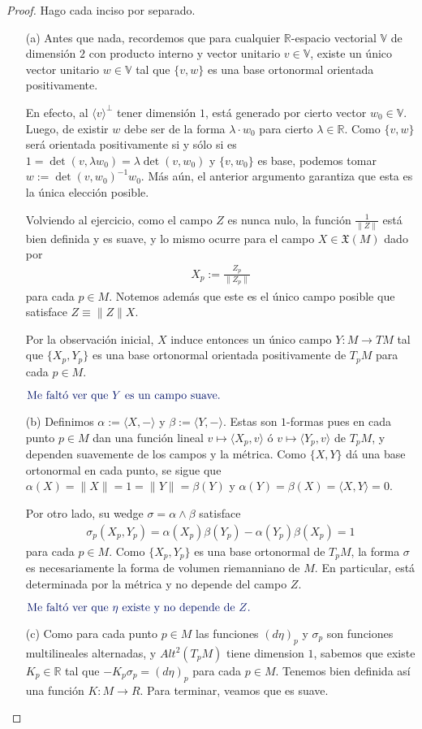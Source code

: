 \documentclass[11pt]{article}
\newcommand{\R}{\mathbb{R}}
\newcommand{\X}{\mathfrak{X}}
\newcommand{\ip}[1]{\langle #1 \rangle}
\newcommand{\paint}[1]{\color{color}{#1}}
\newcommand{\tpaing}[1]{\paint{\text{#1}}}
\begin{document}
\begin{proof} Hago cada inciso por separado.
\begin{itemize}[listparindent = \parindent]
\item[(a)] Antes que nada, recordemos que para cualquier $\R$-espacio vectorial $\mathbb{V}$ de dimensión $2$ con producto interno y vector unitario $v \in \mathbb{V}$, existe un único vector unitario $w \in \mathbb{V}$ tal que $\{v,w\}$ es una base ortonormal orientada positivamente. 

En efecto, al $\ip{v}^\perp$ tener dimensión $1$, está generado por cierto vector $w_0 \in \mathbb{V}$. Luego, de existir $w$ debe ser de la forma $\lambda \cdot w_0$ para cierto $\lambda \in \R$. Como $\{v,w\}$ será orientada positivamente si y sólo si es $1 = \det(v,\lambda w_0)= \lambda \det(v,w_0)$ y $\{v,w_0\}$ es base, podemos tomar $w := \det(v,w_0)^{-1}w_0$. Más aún, el anterior argumento garantiza que esta es la única elección posible.

Volviendo al ejercicio, como el campo $Z$ es nunca nulo, la función $\frac{1}{\|Z\|}$ está bien definida y es suave, y lo mismo ocurre para el campo $X \in \X(M)$ dado por
\begin{align*}
X_p := \frac{Z_p}{\|Z_p\|}
\end{align*}
para cada $p \in M$. Notemos además que este es el único campo posible que satisface $Z \equiv \|Z\|X$. 

Por la observación inicial, $X$ induce entonces un único campo $Y : M \to TM$ tal que $\{X_p,Y_p\}$ es una base ortonormal orientada positivamente de $T_pM$ para cada $p \in M$.
\begin{center}
$\tpaing{Me faltó ver que $Y$ es un campo suave.}$
\end{center}
\item[(b)] Definimos $\alpha := \ip{X,-}$ y $\beta := \ip{Y,-}$. Estas son $1$-formas pues en cada punto $p \in M$ dan una función lineal $v \mapsto \ip{X_p,v}$ ó $v \mapsto \ip{Y_p,v}$ de $T_pM$, y dependen suavemente de los campos y la métrica. Como $\{X,Y\}$ dá una base ortonormal en cada punto, se sigue que $\alpha(X) = \|X\| = 1 = \|Y\| = \beta(Y)$ y $\alpha(Y) = \beta(X) = \ip{X,Y} = 0$. 

Por otro lado, su wedge $\sigma = \alpha \wedge \beta$ satisface
\begin{align*}
\sigma_p(X_p,Y_p) = \alpha(X_p)\beta(Y_p) - \alpha(Y_p)\beta(X_p) = 1
\end{align*}
para cada $p \in M$. Como $\{X_p,Y_p\}$ es una base ortonormal de $T_pM$, la forma $\sigma$ es necesariamente la forma de volumen riemanniano de $M$. En particular, está determinada por la métrica y no depende del campo $Z$.
\begin{center}
$\tpaing{Me faltó ver que $\eta$ existe y no depende de $Z$.}$
\end{center}
\item[(c)] Como para cada punto $p \in M$ las funciones $(d\eta)_p$ y $\sigma_p$ son funciones multilineales alternadas, y $Alt^2(T_pM)$ tiene dimension $1$, sabemos que existe $K_p \in \R$ tal que $-K_p\sigma_p = (d\eta)_p$ para cada $p \in M$. Tenemos bien definida así una función $K : M \to R$. Para terminar, veamos que es suave. 


\end{itemize}
\end{proof}
\end{document}
